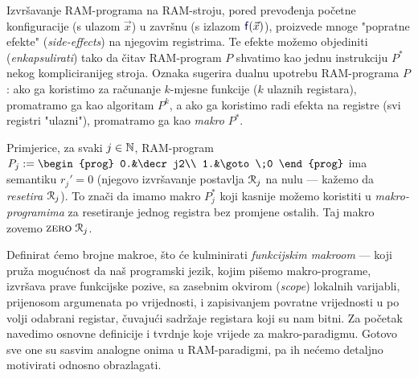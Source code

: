 Izvršavanje RAM-programa na RAM-stroju, pored prevođenja početne konfiguracije (s ulazom $\vec x$) u završnu (s izlazom $\f{f}(\vec x)$), proizvede mnoge "popratne efekte" (\emph{side-effects}) na njegovim registrima. Te efekte možemo objediniti (\emph{enkapsulirati}) tako da čitav RAM-program $P$ shvatimo kao jednu instrukciju $P^*$ nekog kompliciranijeg stroja. 
Oznaka sugerira dualnu upotrebu RAM-programa $P$: ako ga koristimo za računanje $k$-mjesne funkcije ($k$ ulaznih registara), promatramo ga kao algoritam $P^k$, a ako ga koristimo radi efekta na registre (svi registri "ulazni"), promatramo ga kao \emph{makro} $P^*$.

Primjerice, za svaki $j\in{\mathbb N}$, RAM-program $P_j:=\begin{prog}
0.&\decr j2\\
1.&\goto\;0
\end{prog}$ ima semantiku $r_j'=0$ (njegovo izvršavanje postavlja $\mathcal R_{j}$ na nulu --- kažemo da \emph{resetira} $\mathcal R_{j}$). To znači da imamo makro $P_j^*$ koji kasnije možemo koristiti u \emph{makro-programima} za resetiranje jednog registra bez promjene ostalih. Taj makro zovemo $\textsc{zero}\;\mathcal R_{j}$.

Definirat ćemo brojne makroe, što će kulminirati \emph{funkcijskim makroom} --- koji pruža mogućnost da naš programski jezik, kojim pišemo makro-programe, izvršava prave funkcijske pozive, sa zasebnim okvirom (\emph{scope}) lokalnih varijabli, prijenosom argumenata po vrijednosti, i zapisivanjem povratne vrijednosti u po volji odabrani registar, čuvajući sadržaje registara koji su nam bitni. Za početak navedimo osnovne definicije i tvrdnje koje vrijede za makro-paradigmu. Gotovo sve one su sasvim analogne onima u RAM-paradigmi, pa ih nećemo detaljno motivirati odnosno obrazlagati.

